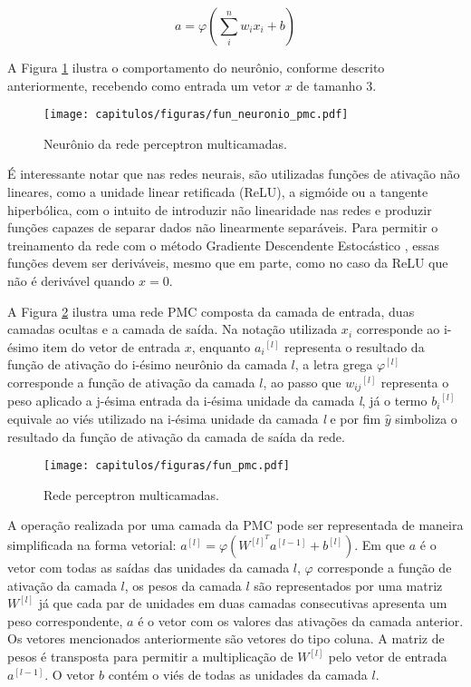 \begin{equation}
    a = \varphi(\sum_{i}^{n}w_ix_i+b)
\label{eq:fun_neuronio_pmc_vector}
\end{equation}

A Figura \ref{fig:fun_neuronio_pmc} ilustra o comportamento do neurônio, conforme descrito anteriormente, recebendo como entrada um vetor $x$ de tamanho 3.

\begin{figure}[!ht]
\centering
\texttt{[image: capitulos/figuras/fun\_neuronio\_pmc.pdf]}
\caption{Neurônio da rede perceptron multicamadas.}
\label{fig:fun_neuronio_pmc}
\end{figure}

É interessante notar que nas redes neurais, são utilizadas funções de ativação não lineares, como a unidade linear retificada (ReLU), a sigmóide ou a tangente hiperbólica, com o intuito de introduzir não linearidade nas redes e produzir funções capazes de separar dados não linearmente separáveis. Para permitir o treinamento da rede com o método Gradiente Descendente Estocástico \cite{robbins1951stochastic}, essas funções devem ser deriváveis, mesmo que em parte, como no caso da ReLU que não é derivável quando $x=0$.

A Figura \ref{fig:fun_pmc} ilustra uma rede PMC composta da camada de entrada, duas camadas ocultas e a camada de saída. Na notação utilizada $x_i$ corresponde ao i-ésimo item do vetor de entrada $x$, enquanto ${a_i}^{[l]}$ representa o resultado da função de ativação do i-ésimo neurônio da camada $l$, a letra grega $\varphi^{[l]}$ corresponde a função de ativação da camada $l$, ao passo que ${w_{ij}}^{[l]}$ representa o peso aplicado a j-ésima entrada da i-ésima unidade da camada \textit{l}, já o termo ${b_i}^{[l]}$ equivale ao viés utilizado na i-ésima unidade da camada \textit{l} e por fim $\hat{y}$ simboliza o resultado da função de ativação da camada de saída da rede.

\begin{figure}[!ht]
\centering
\texttt{[image: capitulos/figuras/fun\_pmc.pdf]}
\caption{Rede perceptron multicamadas.}
\label{fig:fun_pmc}
\end{figure}


A operação realizada por uma camada da PMC pode ser representada de maneira simplificada na forma vetorial: $a^{[l]} = \varphi (W^{[l]^T}a^{[l-1]} + b^{[l]})$. Em que $a$ é o vetor com todas as saídas das unidades da camada $l$, $\varphi$ corresponde a função de ativação da camada $l$, os pesos da camada $l$ são representados por uma matriz $W^{[l]}$ já que cada par de unidades em duas camadas consecutivas apresenta um peso correspondente, $a$ é o vetor com os valores das ativações da camada anterior. Os vetores mencionados anteriormente são vetores do tipo coluna. A matriz de pesos é transposta para permitir a multiplicação de $W^{[l]}$ pelo vetor de entrada $a^{[l-1]}$. O vetor $b$ contém o viés de todas as unidades da camada $l$.


